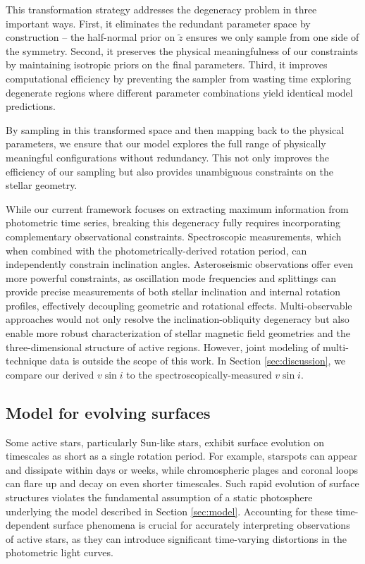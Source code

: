 \documentclass[twocolumn]{aastex631}
\newcommand{\sabinasays}[1]{{\color{purple}#1}}
\begin{document}
\sabinasays{This transformation strategy addresses the degeneracy problem in three important ways. First, it eliminates the redundant 
parameter space by construction -- the half-normal prior on $\tilde{z}$ ensures we only sample from one side of the symmetry. 
Second, it preserves the physical meaningfulness of our constraints by maintaining isotropic priors on the final parameters. 
Third, it improves computational efficiency by preventing the sampler from wasting time exploring degenerate regions where different 
parameter combinations yield identical model predictions.}

By sampling in this transformed space and then mapping back to the physical
parameters, we ensure that our model explores the full range of physically
meaningful configurations without redundancy. This not only improves the
efficiency of our sampling but also provides unambiguous constraints on the
stellar geometry.

\sabinasays{While our current framework focuses on extracting maximum information from photometric time series, breaking this degeneracy fully 
requires incorporating complementary observational constraints. Spectroscopic measurements, which when combined with 
the photometrically-derived rotation period, can independently constrain inclination angles. 
Asteroseismic observations offer even more powerful constraints, as oscillation mode frequencies and splittings 
can provide precise measurements of both stellar inclination and internal rotation profiles, 
effectively decoupling geometric and rotational effects. Multi-observable approaches would not only resolve 
the inclination-obliquity degeneracy but also enable more robust characterization of stellar magnetic field geometries 
and the three-dimensional structure of active regions. However, joint modeling of multi-technique data is outside the scope 
of this work. In Section \ref{sec:discussion}, we compare our derived $v \sin{i}$ to the spectroscopically-measured $v \sin{i}$.}

\subsection{Model for evolving surfaces}
\label{sec:evolmodel}
Some active stars, particularly Sun-like stars, exhibit surface evolution on timescales as short as a single rotation period. For example, starspots can appear and dissipate within days or weeks, 
while chromospheric plages and coronal loops can flare up and decay on even shorter timescales. Such rapid evolution of surface structures violates 
the fundamental assumption of a static photosphere underlying the model described in Section \ref{sec:model}. 
Accounting for these time-dependent surface phenomena is crucial for accurately interpreting observations of active stars, as they can introduce significant 
time-varying distortions in the photometric light curves. 
\end{document}
